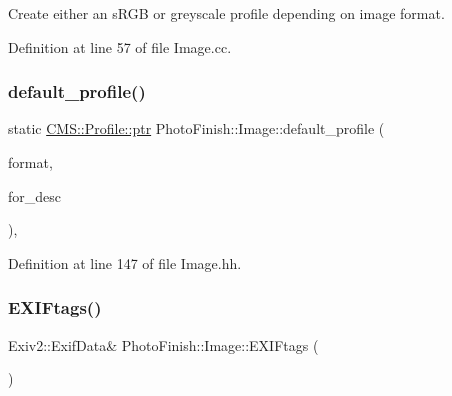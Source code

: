Create either an s\+R\+GB or greyscale profile depending on image format. 



Definition at line 57 of file Image.\+cc.

\mbox{\label{class_photo_finish_1_1_image_a07287a4910a554444f3d637a82c7fa7e}} 
\subsubsection{\texorpdfstring{default\+\_\+profile()}{default\_profile()}\hspace{0.1cm}{\footnotesize\ttfamily [2/2]}}
{\footnotesize\ttfamily static \hyperlink{class_c_m_s_1_1_profile_a7d5a80e1317d17dbfdf5ae69820ab08b}{C\+M\+S\+::\+Profile\+::ptr} Photo\+Finish\+::\+Image\+::default\+\_\+profile (\begin{DoxyParamCaption}\item[{\hyperlink{class_c_m_s_1_1_format}{C\+M\+S\+::\+Format}}]{format,  }\item[{std\+::string}]{for\+\_\+desc }\end{DoxyParamCaption})\hspace{0.3cm}{\ttfamily [inline]}, {\ttfamily [static]}}



Definition at line 147 of file Image.\+hh.

\mbox{\label{class_photo_finish_1_1_image_a56a6612bc223150cf8148cf7f96b88c9}} 
\subsubsection{\texorpdfstring{E\+X\+I\+Ftags()}{EXIFtags()}}
{\footnotesize\ttfamily Exiv2\+::\+Exif\+Data\& Photo\+Finish\+::\+Image\+::\+E\+X\+I\+Ftags (\begin{DoxyParamCaption}\item[{void}]{ }\end{DoxyParamCaption})\hspace{0.3cm}{\ttfamily [inline]}}



